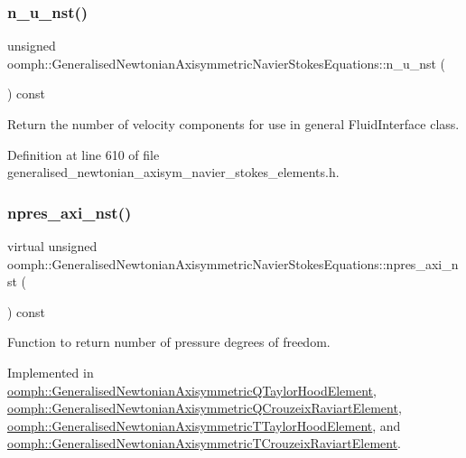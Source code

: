 \subsubsection{\texorpdfstring{n\+\_\+u\+\_\+nst()}{n\_u\_nst()}}
{\footnotesize\ttfamily unsigned oomph\+::\+Generalised\+Newtonian\+Axisymmetric\+Navier\+Stokes\+Equations\+::n\+\_\+u\+\_\+nst (\begin{DoxyParamCaption}{ }\end{DoxyParamCaption}) const\hspace{0.3cm}{\ttfamily [inline]}}



Return the number of velocity components for use in general Fluid\+Interface class. 



Definition at line 610 of file generalised\+\_\+newtonian\+\_\+axisym\+\_\+navier\+\_\+stokes\+\_\+elements.\+h.

\mbox{\label{classoomph_1_1GeneralisedNewtonianAxisymmetricNavierStokesEquations_a4c4c6c5ae937187b735e79451a0befbc}} 
\subsubsection{\texorpdfstring{npres\+\_\+axi\+\_\+nst()}{npres\_axi\_nst()}}
{\footnotesize\ttfamily virtual unsigned oomph\+::\+Generalised\+Newtonian\+Axisymmetric\+Navier\+Stokes\+Equations\+::npres\+\_\+axi\+\_\+nst (\begin{DoxyParamCaption}{ }\end{DoxyParamCaption}) const\hspace{0.3cm}{\ttfamily [pure virtual]}}



Function to return number of pressure degrees of freedom. 



Implemented in \hyperlink{classoomph_1_1GeneralisedNewtonianAxisymmetricQTaylorHoodElement_a4de8fa7d1779cede165db652ebd0c978}{oomph\+::\+Generalised\+Newtonian\+Axisymmetric\+Q\+Taylor\+Hood\+Element}, \hyperlink{classoomph_1_1GeneralisedNewtonianAxisymmetricQCrouzeixRaviartElement_ada9aded5d7ad32924db60b5af2b704c1}{oomph\+::\+Generalised\+Newtonian\+Axisymmetric\+Q\+Crouzeix\+Raviart\+Element}, \hyperlink{classoomph_1_1GeneralisedNewtonianAxisymmetricTTaylorHoodElement_adb127de036210e35b09096c7df88b4d5}{oomph\+::\+Generalised\+Newtonian\+Axisymmetric\+T\+Taylor\+Hood\+Element}, and \hyperlink{classoomph_1_1GeneralisedNewtonianAxisymmetricTCrouzeixRaviartElement_ad42bb6148e35bd44bde015d501fc2a43}{oomph\+::\+Generalised\+Newtonian\+Axisymmetric\+T\+Crouzeix\+Raviart\+Element}.



